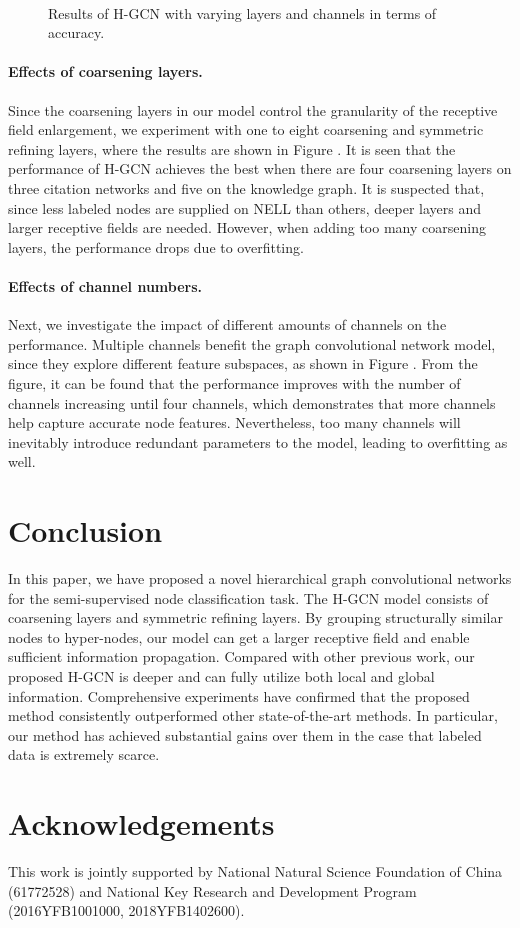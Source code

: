 \documentclass{article}
\begin{document}
\begin{figure}
	\centering
	\\
	\caption{Results of H-GCN with varying layers and channels in terms of accuracy.}
\end{figure}

\paragraph{Effects of coarsening layers.}
Since the coarsening layers in our model control the granularity of the receptive field enlargement, we experiment with one to eight coarsening and symmetric refining layers, where the results are shown in Figure . It is seen that the performance of H-GCN achieves the best when there are four coarsening layers on three citation networks and five on the knowledge graph. It is suspected that, since less labeled nodes are supplied on NELL than others, deeper layers and larger receptive fields are needed. However, when adding too many coarsening layers, the performance drops due to overfitting.

\paragraph{Effects of channel numbers.}
Next, we investigate the impact of different amounts of channels on the performance. Multiple channels benefit the graph convolutional network model, since they explore different feature subspaces, as shown in Figure . From the figure, it can be found that the performance improves with the number of channels increasing until four channels, which demonstrates that more channels help capture accurate node features. Nevertheless, too many channels will inevitably introduce redundant parameters to the model, leading to overfitting as well.
 \section{Conclusion}

In this paper, we have proposed a novel hierarchical graph convolutional networks for the semi-supervised node classification task. The H-GCN model consists of coarsening layers and symmetric refining layers. By grouping structurally similar nodes to hyper-nodes, our model can get a larger receptive field and enable sufficient information propagation. Compared with other previous work, our proposed H-GCN is deeper and can fully utilize both local and global information. Comprehensive experiments have confirmed that the proposed method consistently outperformed other state-of-the-art methods. In particular, our method has achieved substantial gains over them in the case that labeled data is extremely scarce.

\section*{Acknowledgements}

This work is jointly supported by National Natural Science Foundation of China (61772528) and National Key Research and Development Program (2016YFB1001000, 2018YFB1402600).
 


\end{document}
